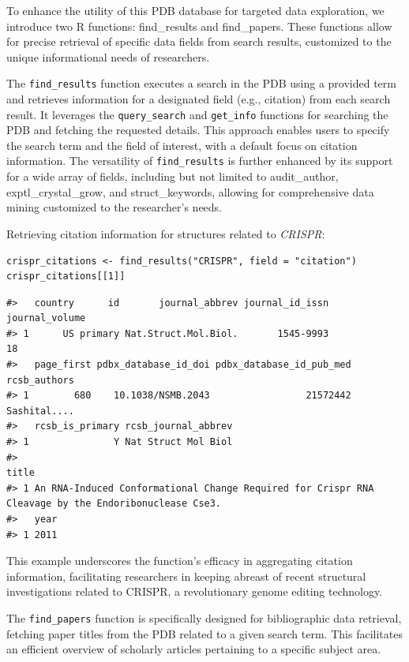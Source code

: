 To enhance the utility of this PDB database for targeted data exploration, we introduce two R functions: find\_results and find\_papers. These functions allow for precise retrieval of specific data fields from search results, customized to the unique informational needs of researchers.

The \texttt{find\_results} function executes a search in the PDB using a provided term and retrieves information for a designated field (e.g., citation) from each search result. It leverages the \texttt{query\_search} and \texttt{get\_info} functions for searching the PDB and fetching the requested details. This approach enables users to specify the search term and the field of interest, with a default focus on citation information. The versatility of \texttt{find\_results} is further enhanced by its support for a wide array of fields, including but not limited to audit\_author, exptl\_crystal\_grow, and struct\_keywords, allowing for comprehensive data mining customized to the researcher's needs.

Retrieving citation information for structures related to \emph{CRISPR}:

\begin{verbatim}
crispr_citations <- find_results("CRISPR", field = "citation")
crispr_citations[[1]]
\end{verbatim}

\begin{verbatim}
#>   country      id       journal_abbrev journal_id_issn journal_volume
#> 1      US primary Nat.Struct.Mol.Biol.       1545-9993             18
#>   page_first pdbx_database_id_doi pdbx_database_id_pub_med rcsb_authors
#> 1        680    10.1038/NSMB.2043                 21572442 Sashital....
#>   rcsb_is_primary rcsb_journal_abbrev
#> 1               Y Nat Struct Mol Biol
#>                                                                                                 title
#> 1 An RNA-Induced Conformational Change Required for Crispr RNA Cleavage by the Endoribonuclease Cse3.
#>   year
#> 1 2011
\end{verbatim}

This example underscores the function's efficacy in aggregating citation information, facilitating researchers in keeping abreast of recent structural investigations related to CRISPR, a revolutionary genome editing technology.

The \texttt{find\_papers} function is specifically designed for bibliographic data retrieval, fetching paper titles from the PDB related to a given search term. This facilitates an efficient overview of scholarly articles pertaining to a specific subject area.

